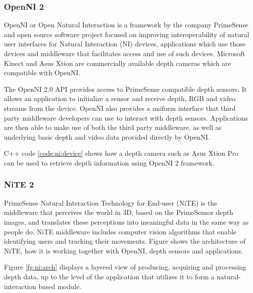 \subsubsection{OpenNI 2} OpenNI or Open Natural Interaction \cite{11} is a framework by the company PrimeSense and open source software project focused on improving interoperability of natural user interfaces for Natural Interaction (NI) devices, applications which use those devices and middleware that facilitates access and use of such devices. Microsoft Kinect and Asus Xtion are commercially available depth cameras which are compatible with OpenNI.

The OpenNI 2.0 API provides access to PrimeSense compatible depth sensors. It allows an application to initialize a sensor and receive depth, RGB and video streams from the device. OpenNI also provides a uniform interface that third party middleware developers can use to interact with depth sensors. Applications are then able to make use of both the third party middleware, as well as underlying basic depth and video data provided directly by OpenNI.

C++ code \ref{code:ni:device} shows how a depth camera such as Asus Xtion Pro can be used to retrieve depth information using OpenNI 2 framework.

 \label{code:ni:device}

\subsubsection{NiTE 2} \label{sec:nite} PrimeSense Natural Interaction Technology for End-user (NiTE) \cite{12} is the middleware that perceives the world in 3D, based on the PrimeSensor depth images, and translates these perceptions into meaningful data in the same way as people do. NiTE middleware includes computer vision algorithms that enable identifying users and tracking their movements. Figure shows the architecture of NiTE, how it is working together with OpenNI, depth sensors and applications.

Figure \ref{fg:ni:arch} displays a layered view of producing, acquiring and processing depth data, up to the level of the application that utilizes it to form a natural- interaction based module. 



